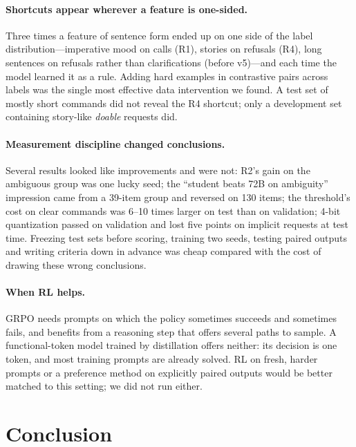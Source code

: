 \paragraph{Shortcuts appear wherever a feature is one-sided.} Three times a feature of sentence form ended up on one side of
the label distribution---imperative mood on calls (R1), stories on refusals (R4), long sentences on refusals rather than
clarifications (before v5)---and each time the model learned it as a rule. Adding hard examples in contrastive pairs across
labels was the single most effective data intervention we found. A test set of mostly short commands did not reveal the R4
shortcut; only a development set containing story-like \emph{doable} requests did.

\paragraph{Measurement discipline changed conclusions.} Several results looked like improvements and were not: R2's gain on
the ambiguous group was one lucky seed; the ``student beats 72B on ambiguity'' impression came from a 39-item group and
reversed on 130 items; the threshold's cost on clear commands was 6--10 times larger on test than on validation; 4-bit
quantization passed on validation and lost five points on implicit requests at test time. Freezing test sets before scoring,
training two seeds, testing paired outputs and writing criteria down in advance was cheap compared with the cost of drawing
these wrong conclusions.

\paragraph{When RL helps.} GRPO needs prompts on which the policy sometimes succeeds and sometimes fails, and benefits from a
reasoning step that offers several paths to sample. A functional-token model trained by distillation offers neither: its
decision is one token, and most training prompts are already solved. RL on fresh, harder prompts or a preference method on
explicitly paired outputs \citep{ross2025when2call} would be better matched to this setting; we did not run either.

\section{Conclusion}
\label{sec:conclusion}

